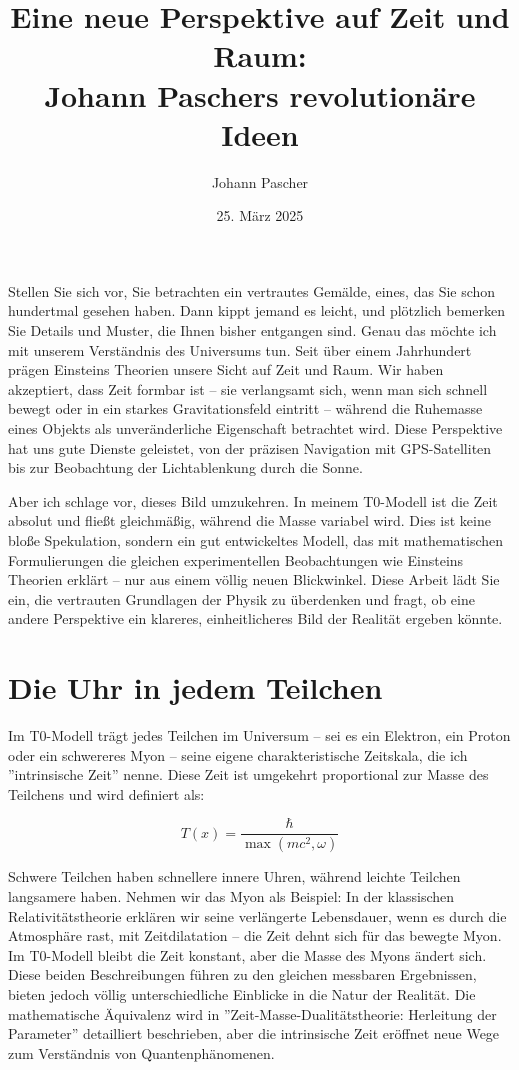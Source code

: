\documentclass[a4paper,12pt]{article}
\title{Eine neue Perspektive auf Zeit und Raum: \\Johann Paschers revolutionäre Ideen}
\author{Johann Pascher}
\date{25. März 2025}
\newcommand{\Tfield}{T(x)}
\begin{document}
	
	\maketitle
	
	Stellen Sie sich vor, Sie betrachten ein vertrautes Gemälde, eines, das Sie schon hundertmal gesehen haben. Dann kippt jemand es leicht, und plötzlich bemerken Sie Details und Muster, die Ihnen bisher entgangen sind. Genau das möchte ich mit unserem Verständnis des Universums tun. Seit über einem Jahrhundert prägen Einsteins Theorien unsere Sicht auf Zeit und Raum. Wir haben akzeptiert, dass Zeit formbar ist – sie verlangsamt sich, wenn man sich schnell bewegt oder in ein starkes Gravitationsfeld eintritt – während die Ruhemasse eines Objekts als unveränderliche Eigenschaft betrachtet wird. Diese Perspektive hat uns gute Dienste geleistet, von der präzisen Navigation mit GPS-Satelliten bis zur Beobachtung der Lichtablenkung durch die Sonne.
	
	Aber ich schlage vor, dieses Bild umzukehren. In meinem T0-Modell ist die Zeit absolut und fließt gleichmäßig, während die Masse variabel wird. Dies ist keine bloße Spekulation, sondern ein gut entwickeltes Modell, das mit mathematischen Formulierungen die gleichen experimentellen Beobachtungen wie Einsteins Theorien erklärt – nur aus einem völlig neuen Blickwinkel. Diese Arbeit lädt Sie ein, die vertrauten Grundlagen der Physik zu überdenken und fragt, ob eine andere Perspektive ein klareres, einheitlicheres Bild der Realität ergeben könnte.
	
	\section{Die Uhr in jedem Teilchen}
	
	Im T0-Modell trägt jedes Teilchen im Universum – sei es ein Elektron, ein Proton oder ein schwereres Myon – seine eigene charakteristische Zeitskala, die ich ''intrinsische Zeit'' nenne. Diese Zeit ist umgekehrt proportional zur Masse des Teilchens und wird definiert als:
	
	\begin{equation}
		\Tfield = \frac{\hbar}{\max(m c^2, \omega)}
	\end{equation}
	
	Schwere Teilchen haben schnellere innere Uhren, während leichte Teilchen langsamere haben. Nehmen wir das Myon als Beispiel: In der klassischen Relativitätstheorie erklären wir seine verlängerte Lebensdauer, wenn es durch die Atmosphäre rast, mit Zeitdilatation – die Zeit dehnt sich für das bewegte Myon. Im T0-Modell bleibt die Zeit konstant, aber die Masse des Myons ändert sich. Diese beiden Beschreibungen führen zu den gleichen messbaren Ergebnissen, bieten jedoch völlig unterschiedliche Einblicke in die Natur der Realität. Die mathematische Äquivalenz wird in ''Zeit-Masse-Dualitätstheorie: Herleitung der Parameter'' \cite{pascher_params_2025} detailliert beschrieben, aber die intrinsische Zeit eröffnet neue Wege zum Verständnis von Quantenphänomenen.
	
\end{document}
